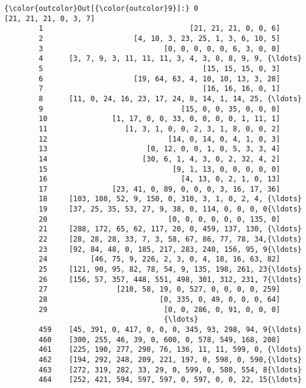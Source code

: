 \documentclass[11pt]{article}
\begin{document}
\begin{Verbatim}[commandchars=\\\{\}]
{\color{outcolor}Out[{\color{outcolor}9}]:} 0                                  [21, 21, 21, 0, 3, 7]
        1                                  [21, 21, 21, 0, 0, 6]
        2                     [4, 10, 3, 23, 25, 1, 3, 6, 10, 5]
        3                            [0, 0, 0, 0, 0, 6, 3, 0, 0]
        4      [3, 7, 9, 3, 11, 11, 11, 3, 4, 3, 8, 8, 9, 9, {\ldots}
        5                                     [15, 15, 15, 0, 3]
        6                     [19, 64, 63, 4, 10, 10, 13, 3, 28]
        7                                     [16, 16, 16, 0, 1]
        8      [11, 0, 24, 16, 23, 17, 24, 8, 14, 1, 14, 25, {\ldots}
        9                                [15, 0, 0, 35, 0, 0, 0]
        10               [1, 17, 0, 0, 33, 0, 0, 0, 0, 1, 11, 1]
        11                  [1, 3, 1, 0, 0, 2, 3, 1, 8, 0, 0, 2]
        12                            [14, 0, 14, 0, 4, 1, 0, 3]
        13                       [0, 12, 0, 0, 1, 0, 5, 3, 3, 4]
        14                      [30, 6, 1, 4, 3, 0, 2, 32, 4, 2]
        15                             [9, 1, 13, 0, 0, 0, 0, 0]
        16                               [4, 13, 0, 2, 1, 0, 13]
        17               [23, 41, 0, 89, 0, 0, 0, 3, 16, 17, 36]
        18     [103, 108, 52, 9, 150, 0, 310, 3, 1, 0, 2, 4, {\ldots}
        19     [37, 25, 35, 53, 27, 9, 38, 0, 114, 0, 0, 0, 0{\ldots}
        20                            [0, 0, 0, 0, 0, 0, 135, 0]
        21     [288, 172, 65, 62, 117, 20, 0, 459, 137, 130, {\ldots}
        22     [28, 28, 28, 33, 7, 3, 58, 67, 86, 77, 78, 34,{\ldots}
        23     [92, 84, 48, 0, 185, 217, 283, 240, 156, 95, 9{\ldots}
        24          [46, 75, 9, 226, 2, 3, 0, 4, 18, 16, 63, 82]
        25     [121, 90, 95, 82, 78, 54, 9, 135, 198, 261, 23{\ldots}
        26     [156, 57, 357, 448, 551, 498, 301, 312, 231, 7{\ldots}
        27                [210, 58, 19, 0, 527, 0, 0, 0, 0, 259]
        28                          [0, 335, 0, 49, 0, 0, 0, 64]
        29                           [0, 0, 286, 0, 91, 0, 0, 0]
                                     {\ldots}                        
        459    [45, 391, 0, 417, 0, 0, 0, 345, 93, 298, 94, 9{\ldots}
        460    [300, 255, 46, 39, 0, 600, 0, 578, 549, 168, 208]
        461    [225, 190, 277, 290, 76, 136, 11, 11, 599, 0, {\ldots}
        462    [194, 292, 248, 209, 221, 197, 0, 598, 0, 590,{\ldots}
        463    [272, 319, 282, 33, 29, 0, 599, 0, 580, 554, 8{\ldots}
        464    [252, 421, 594, 597, 597, 0, 597, 0, 0, 22, 15{\ldots}

\end{Verbatim}
\end{document}
